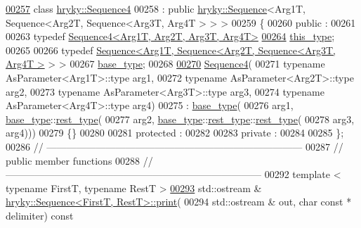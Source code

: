 \begin{DoxyCode}
\hypertarget{sequence_8h_source_l00257}{}\hyperlink{classhryky_1_1_sequence4}{00257} \textcolor{keyword}{class }\hyperlink{classhryky_1_1_sequence4}{hryky::Sequence4}
00258     : \textcolor{keyword}{public} \hyperlink{classhryky_1_1_sequence}{hryky::Sequence}<Arg1T, Sequence<Arg2T, Sequence<Arg3T, Arg4T > > >
00259 \{
00260 \textcolor{keyword}{public} :
00261 
00263     \textcolor{keyword}{typedef} \hyperlink{classhryky_1_1_sequence4}{Sequence4<Arg1T, Arg2T, Arg3T, Arg4T>}
\hypertarget{sequence_8h_source_l00264}{}\hyperlink{classhryky_1_1_sequence4_a6a1a7284ea57c3c45cf5ac0f64869897}{00264}         \hyperlink{classhryky_1_1_sequence4_a6a1a7284ea57c3c45cf5ac0f64869897}{this_type};
00265     
00266     \textcolor{keyword}{typedef} \hyperlink{classhryky_1_1_sequence}{Sequence<Arg1T, Sequence<Arg2T, Sequence<Arg3T, Arg4T >} > >
00267         \hyperlink{classhryky_1_1_sequence}{base_type};
00268 
\hypertarget{sequence_8h_source_l00270}{}\hyperlink{classhryky_1_1_sequence4_af3dd49d3f0e7a40b6b0334e54e8c3bc5}{00270}     \hyperlink{classhryky_1_1_sequence4_af3dd49d3f0e7a40b6b0334e54e8c3bc5}{Sequence4}(
00271         \textcolor{keyword}{typename} AsParameter<Arg1T>::type arg1,
00272         \textcolor{keyword}{typename} AsParameter<Arg2T>::type arg2,
00273         \textcolor{keyword}{typename} AsParameter<Arg3T>::type arg3,
00274         \textcolor{keyword}{typename} AsParameter<Arg4T>::type arg4)
00275         : \hyperlink{classhryky_1_1_sequence}{base_type}(
00276             arg1, \hyperlink{classhryky_1_1_sequence}{base_type}::\hyperlink{classhryky_1_1_sequence}{rest_type}(
00277                 arg2, \hyperlink{classhryky_1_1_sequence}{base_type}::\hyperlink{classhryky_1_1_sequence}{rest_type}::\hyperlink{classhryky_1_1_sequence}{rest_type}(
00278                     arg3, arg4)))
00279     \{\}
00280 
00281 \textcolor{keyword}{protected} :
00282 
00283 \textcolor{keyword}{private} :
00284 
00285 \};
00286 \textcolor{comment}{//
      ------------------------------------------------------------------------------}
00287 \textcolor{comment}{// public member functions}
00288 \textcolor{comment}{//
      ------------------------------------------------------------------------------}
00292 \textcolor{comment}{}\textcolor{keyword}{template} < \textcolor{keyword}{typename} FirstT, \textcolor{keyword}{typename} RestT >
\hypertarget{sequence_8h_source_l00293}{}\hyperlink{classhryky_1_1_sequence_a8443de2eb918764c345a86b40dd888db}{00293} std::ostream & \hyperlink{classhryky_1_1_sequence_a8443de2eb918764c345a86b40dd888db}{hryky::Sequence<FirstT, RestT>::print}(
00294     std::ostream & out, \textcolor{keywordtype}{char} \textcolor{keyword}{const} * delimiter)\textcolor{keyword}{ const}

\end{DoxyCode}
